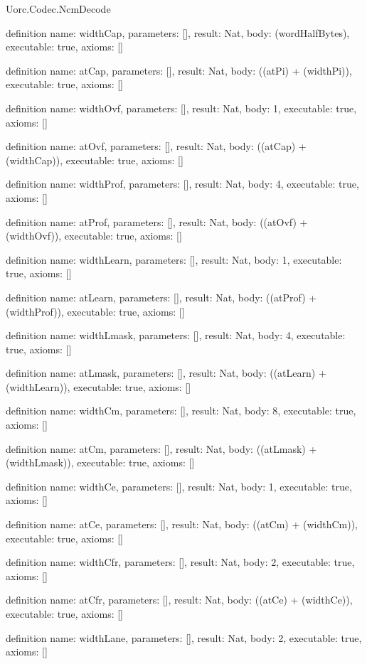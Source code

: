 \begin{lexlean}{Uorc.Codec.NcmDecode}
\begin{semanticmodule}
definition{
  name: widthCap,
  parameters: [],
  result: Nat,
  body: (wordHalfBytes),
  executable: true,
  axioms: []
}

definition{
  name: atCap,
  parameters: [],
  result: Nat,
  body: ((atPi) + (widthPi)),
  executable: true,
  axioms: []
}

definition{
  name: widthOvf,
  parameters: [],
  result: Nat,
  body: 1,
  executable: true,
  axioms: []
}

definition{
  name: atOvf,
  parameters: [],
  result: Nat,
  body: ((atCap) + (widthCap)),
  executable: true,
  axioms: []
}

definition{
  name: widthProf,
  parameters: [],
  result: Nat,
  body: 4,
  executable: true,
  axioms: []
}

definition{
  name: atProf,
  parameters: [],
  result: Nat,
  body: ((atOvf) + (widthOvf)),
  executable: true,
  axioms: []
}

definition{
  name: widthLearn,
  parameters: [],
  result: Nat,
  body: 1,
  executable: true,
  axioms: []
}

definition{
  name: atLearn,
  parameters: [],
  result: Nat,
  body: ((atProf) + (widthProf)),
  executable: true,
  axioms: []
}

definition{
  name: widthLmask,
  parameters: [],
  result: Nat,
  body: 4,
  executable: true,
  axioms: []
}

definition{
  name: atLmask,
  parameters: [],
  result: Nat,
  body: ((atLearn) + (widthLearn)),
  executable: true,
  axioms: []
}

definition{
  name: widthCm,
  parameters: [],
  result: Nat,
  body: 8,
  executable: true,
  axioms: []
}

definition{
  name: atCm,
  parameters: [],
  result: Nat,
  body: ((atLmask) + (widthLmask)),
  executable: true,
  axioms: []
}

definition{
  name: widthCe,
  parameters: [],
  result: Nat,
  body: 1,
  executable: true,
  axioms: []
}

definition{
  name: atCe,
  parameters: [],
  result: Nat,
  body: ((atCm) + (widthCm)),
  executable: true,
  axioms: []
}

definition{
  name: widthCfr,
  parameters: [],
  result: Nat,
  body: 2,
  executable: true,
  axioms: []
}

definition{
  name: atCfr,
  parameters: [],
  result: Nat,
  body: ((atCe) + (widthCe)),
  executable: true,
  axioms: []
}

definition{
  name: widthLane,
  parameters: [],
  result: Nat,
  body: 2,
  executable: true,
  axioms: []
}


\end{semanticmodule}
\end{lexlean}
